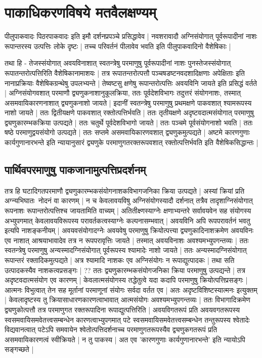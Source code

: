 \section{पाकाधिकरणविषये मतवैलक्षण्यम्}

पीलुपाकवादः पिठरपाकवादः इति इमौ दर्शनप्रपञ्चे प्रसिद्धावेव | नवशरावादौ अग्निसंयोगात् पूर्वरूपादीनां नाशः रूपान्तरस्य उत्पत्तिः लोके दृष्टः | तच्च परिवर्तनं पीलावेव भवति इति पीलुपाकवादिनो वैशेषिकाः | 

तथा हि - तेजस्संयोगात् अवयविनाशात् स्वतन्त्रेषु परमाणुषु पूर्वरूपादीनां नाशः पुनस्तेजस्संयोगात् रूपातन्तरोत्पत्तिरिति वैशेषिकानामाशयः | तत्र रूपातन्तरोत्पत्तौ पञ्चषडष्टनवदशादिक्षणाः अपेक्षिताः इति नानाप्रक्रियाः वैशेषिकग्रन्थेषु उपलभ्यन्ते | तेष्वष्टसु क्षणेषु रूपान्तरोत्पत्तिः अवयविनि जायते इति प्रसिद्धं वर्तते | अग्निसंयोगवशात् परमाणौ द्व्यणुकनाशानुकूलक्रिया, ततः पूर्वदेशविभागः तदुत्तरं संयोगनाशः, तस्मात् असमवायिकारणनाशात् द्व्यणुकनाशो जायते | इदानीं स्वतन्त्रेषु परमाणुषु प्रथमक्षणे पाकवशात् श्यामरूपस्य नाशो जायते | ततः द्वितीयक्षणे पाकवशात् रक्तोत्पत्तिर्भवति | ततः तृतीयक्षणे अदृष्टवदात्मसंयोगात् परमाणुषु द्व्यणुकारम्भकक्रिया उत्पद्यते | ततः‌ चतुर्थे पूर्वदेशविभागो जायते | ततः पञ्चमे पूर्वसंयोगनाशो भवति | ततः षष्ठे परमाणुद्वयसंयोगो उत्पद्यते | ततः सप्तमे असमवायिकारणवशात् द्व्यणुकमुत्पद्यते | अष्टमे कारणगुणाः कार्यगुणानारभन्ते इति न्यायानुसारं द्व्यणुके परमाणुगतरक्तरूपवशात् रक्तोत्पत्तिर्भवति इति वैशेषिकसिद्धान्तः |

\subsection{पार्थिवपरमाणुषु पाकजानामुत्पत्तिप्रदर्शनम्}

तत्र हि घटादिगतपरमाणौ द्व्यणुकारम्भकसंयोगनाशकविभागजनिका क्रिया उत्पद्यते | अस्यां क्रियां प्रति अग्न्यभिघातः\ नोदनं वा कारणम् | न च केवलावयविषु अग्निसंयोगस्यादौ दर्शनात् तत्रैव तादृशाग्निसंयोगात् रूपनाशः रूपान्तरोत्पत्तिश्च जायतामिति वाच्यम् | अतितीक्ष्णस्याग्नेः क्षणाभ्यन्तरे सर्वावयवेन सह संयोगस्य अभ्युपगमात् केवलावयविरूपस्य परावर्तकत्वस्याग्नेः कल्पनासम्भवात् | अवयविनि अपि रूपपरावर्तनं भवतु इत्यपि नाशङ्कनीयम् | अवयवसंयोगादग्नेः अवयवेषु परमाणुषु क्रियोत्पत्त्या द्व्यणुकादिनाशक्रमेण अवयविनः एव नाशात् आश्रयाभावादेव तत्र न रूपपरावृत्तिः जायते | तस्मात् अवयविनाशः अवश्यमभ्युपगन्तव्यः | ततः स्वतन्त्रेषु परमाणुषु अन्यस्मादग्निसंयोगात् पूर्वरूपस्य श्यामादेः नाशो जायते | ततः अन्यस्मादग्निसंयोगात् रूपान्तरं रक्तादिकमुत्पद्यते | अत्र श्यामादि नाशकः एव अग्निसंयोगः न रूपाद्युत्पादकः‌ | तथा सति उत्पादकस्यैव नाशकत्वप्रसङ्गः | ?? ततः द्व्यणुकारम्भकसंयोगजनिका क्रिया परमाणुषु उत्पद्यन्ते | तत्र अदृष्टवदात्मसंयोग एव कारणम् | केवलात्मसंयोगस्य तद्धेतुत्वे यदा कदापि परमाणुषु क्रियोत्पत्तिप्रसङ्गः | आत्मनः विभुत्वात् तेन सह मूर्तानां परमाणूनां संयोगः सर्वदा वर्तत एव | अतः अदृष्टविशिष्टस्यात्मनः इत्युक्तम् | केवलादृष्टस्य तु क्रियासाधारणकारणत्वाभावात् आत्मसंयोगः अवश्यमभ्युपगन्तव्यः | ततः विभागादिक्रमेण द्व्यणुकोत्पत्तौ तत्र परमाणुगत रक्तरूपादिना रूपाद्युत्पत्तिरिति | अवयविगतरूपं प्रति अवयवगतरूपस्य स्वसमवायिसमवेतत्त्वसम्बन्धेन कारणत्वाभ्युपगमात् पटे स्वसमवायिसमवेतत्त्वसम्बन्धेन तन्तुरूपस्य श्वेतादेः विद्यवानत्वात् पटेऽपि समवायेन श्वेतोत्पत्तिदर्शनाच्च परमाणुगतरूपस्यैव द्व्यणुकगतरूपं प्रति असमवायिकारणत्वं स्वीक्रियते | न तु पाकस्य | अत एव 'कारणगुणाः कार्यगुणानारभन्ते' इति न्यायोऽपि सङ्गच्छते |

